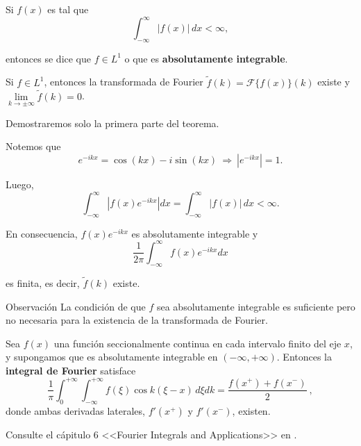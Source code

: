\begin{defi} 
Si $f(x)$ es tal que 
$$\int_{-\infty}^{\infty} |f(x)| \,dx < \infty,$$

entonces se dice que $f \in  L^1$ o que es \textbf{absolutamente integrable}.
\end{defi}

\begin{teorema}
Si $f \in L^1$, entonces la transformada de Fourier $\tilde{f}(k) = \mathcal{F}\{f(x)\}(k)$ existe y $\lim\limits_{k \to \pm \infty} \tilde{f}(k) = 0$.
\end{teorema}

\begin{demo}

Demostraremos solo la primera parte del teorema.

Notemos que
$$e^{-ikx} = \cos(kx) - i \sin(kx) ~\Rightarrow~ |e^{-ikx}| = 1.$$

Luego,
$$ \int_{-\infty}^{\infty} |f(x) e^{-ikx}| dx =  \int_{- \infty}^{\infty} |f(x)| \,dx < \infty.$$

En consecuencia, $f(x) e^{-ikx}$ es absolutamente integrable y
$$\frac{1}{2\pi} \int_{-\infty}^{\infty} f(x) e^{-ikx} dx$$

es finita, es decir, $\tilde{f}(k)$ existe. 
\end{demo}

\begin{obs}{Observación}
    La condición de que $f$ sea absolutamente integrable es suficiente pero no necesaria para la existencia de la transformada de Fourier.
\end{obs}

\begin{teorema}
    Sea $f(x)$ una función seccionalmente continua en cada intervalo finito del eje $x$, y supongamos que es absolutamente integrable en $(-\infty, + \infty)$. Entonces la \textbf{integral de Fourier} satisface
\begin{equation}
    \frac{1}{\pi} \int_0^{+\infty} \int_{-\infty}^{+\infty} f(\xi) \cos k(\xi-x) \,d\xi dk = \frac{f(x^+) + f(x^-)}{2} \ ,    
\end{equation}
donde ambas derivadas laterales, $f'(x^+)$ y $f'(x^-)$, existen.
\end{teorema}

\begin{demo}
Consulte el cápitulo 6 <<Fourier Integrals and Applications>> en \cite{Brown}.
\end{demo}

